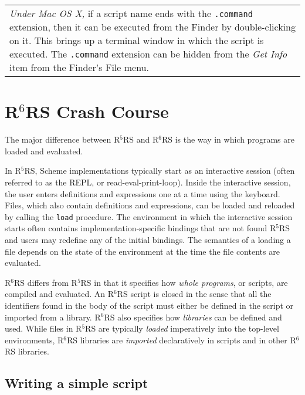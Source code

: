 \documentclass[onecolumn, 12pt, twoside, openright, dvipdfm]{book}
\newcommand{\rnrs}[1]{R$^{\mathrm{#1}}$RS}
\newcommand{\BoxedText}[2]{
  \vspace{.05in}
  \begin{center}
    \begin{tabular}{|p{4.6in}|} {\large \emph{#1}} #2 \end{tabular}
  \end{center}
  \vspace{.05in}
}
\begin{document}
\BoxedText{Under Mac OS X,}{if a script name ends with the
\texttt{.command} extension, then it can be executed from the Finder
by double-clicking on it.  This brings up a terminal window in which
the script is executed.  The \texttt{.command} extension can be
hidden from the \emph{Get Info} item from the Finder's File menu.}




\chapter{\rnrs{6} Crash Course}

The major difference between \rnrs{5} and \rnrs{6} is the way
in which programs are loaded and evaluated.  

In \rnrs{5}, Scheme implementations typically start as an
interactive session (often referred to as the REPL, or
read-eval-print-loop).  Inside the interactive session, the user
enters definitions and expressions one at a time using the keyboard.
Files, which also contain definitions and expressions, can be loaded
and reloaded by calling the \texttt{load} procedure.  The
environment in which the interactive session starts often contains
implementation-specific bindings that are not found \rnrs{5} and
users may redefine any of the initial bindings.  The semantics of a
loading a file depends on the state of the environment at the time
the file contents are evaluated.

\index{R6RS Script@\rnrs{6} Script!Import} 
%
\rnrs{6} differs from \rnrs{5} in that it specifies how \emph{whole
programs}, or scripts, are compiled and evaluated.  An \rnrs{6}
script is closed in the sense that all the identifiers found in the
body of the script must either be defined in the script or imported
from a library.  \rnrs{6} also specifies how \emph{libraries} can be
defined and used.  While files in \rnrs{5} are typically
\emph{loaded} imperatively into the top-level environments, \rnrs{6}
libraries are \emph{imported} declaratively in scripts and in other
\rnrs{6} libraries. 

\section{\label{sec:scripts}Writing a simple script}
\end{document}
